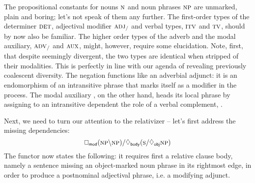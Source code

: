 The propositional constants for nouns $\n[s]$ and noun phrases $\np[s]$ are unmarked, plain and boring; let's not speak of them any further.
The first-order types of the determiner $\textsc{\normalfont\textsc{det}}$, adjectival modifier $\textsc{\normalfont\textsc{adj}}_{/}$ and verbal types, $\textsc{\normalfont\textsc{itv}}$ and $\textsc{\normalfont\textsc{tv}}$, should by now also be familiar.
The higher order types of the adverb and the modal auxiliary, $\textsc{\normalfont\textsc{adv}}_{/}$ and $\textsc{\normalfont\textsc{aux}}$, might, however, require some elucidation.
Note, first, that despite seemingly divergent, the two types are identical when stripped of their modalities.
This is perfectly in line with our agenda of revealing previously coalescent diversity.
The negation  functions like an adverbial adjunct: it is an endomorphism of an intransitive phrase that marks itself as a modifier in the process.
The modal auxiliary , on the other hand, heads its local phrase by assigning to an intransitive dependent the role of a verbal complement, .

Next, we need to turn our attention to the relativizer -- let's first address the missing dependencies:
\begin{equation}
\dbox{mod}(\np\divleft\np)\divright\ddia{body}(\s\divright\ddia{obj}\np)\label{equation:deprel}
\end{equation}
The functor now states the following: it requires first a relative clause body, namely a sentence missing an object-marked noun phrase in its rightmost edge, in order to produce a postnominal adjectival phrase, i.e. a modifying adjunct.

